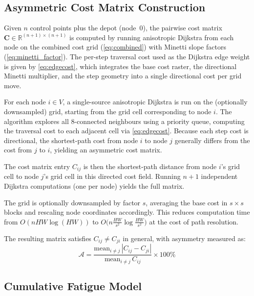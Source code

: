 \documentclass[11pt,a4paper]{article}
\begin{document}
\subsection{Asymmetric Cost Matrix Construction}
\label{sec:costmatrix}

Given $n$ control points plus the depot (node~0), the pairwise cost matrix $\mathbf{C} \in \mathbb{R}^{(n+1) \times (n+1)}$ is computed by running anisotropic Dijkstra from each node on the combined cost grid (\cref{eq:combined}) with Minetti slope factors (\cref{eq:minetti_factor}).
The per-step traversal cost used as the Dijkstra edge weight is given by \cref{eq:edgecost}, which integrates the base cost raster, the directional Minetti multiplier, and the step geometry into a single directional cost per grid move.

For each node $i \in V$, a single-source anisotropic Dijkstra is run on the (optionally downsampled) grid, starting from the grid cell corresponding to node $i$.
The algorithm explores all 8-connected neighbours using a priority queue, computing the traversal cost to each adjacent cell via \cref{eq:edgecost}.
Because each step cost is directional, the shortest-path cost from node $i$ to node $j$ generally differs from the cost from $j$ to $i$, yielding an asymmetric cost matrix.

The cost matrix entry $C_{ij}$ is then the shortest-path distance from node $i$'s grid cell to node $j$'s grid cell in this directed cost field.
Running $n+1$ independent Dijkstra computations (one per node) yields the full matrix.

The grid is optionally downsampled by factor $s$, averaging the base cost in $s \times s$ blocks and rescaling node coordinates accordingly.
This reduces computation time from $O(nHW \log(HW))$ to $O\bigl(n \frac{HW}{s^2} \log \frac{HW}{s^2}\bigr)$ at the cost of path resolution.

The resulting matrix satisfies $C_{ij} \neq C_{ji}$ in general, with asymmetry measured as:
\begin{equation}
  \mathcal{A} = \frac{\text{mean}_{i \neq j}\, |C_{ij} - C_{ji}|}{\text{mean}_{i \neq j}\, C_{ij}} \times 100\%
  \label{eq:asymmetry}
\end{equation}

\subsection{Cumulative Fatigue Model}
\label{sec:fatigue}
\end{document}
